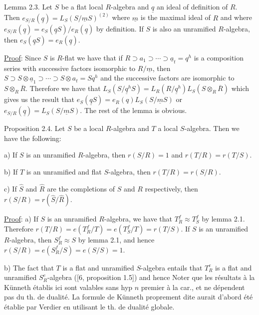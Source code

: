 Lemma 2.3. Let $S$ be a flat local $R$-algebra and $\underline q$ an ideal of definition
of $R$. Then $e_{S/R}(\underline q)=L_S(S/\underline m S)^{(2)}$ where $\underline m$ is the maximal ideal of $R$ and
where $e_{S/R}(\underline q)=e_S(\underline q S)/e_R(\underline q)$ by definition. If $S$ is also an unramified
$R$-algebra, then $e_S(\underline q S)=e_R(\underline q)$.

\uline{Proof}: Since $S$ is $R$-flat we have that if $R\supset a_1\supset\cdots\supset\underline a_t=q^h$
is a composition series with successive factors isomorphic to $R/\underline m$, then
$S\supset S\otimes\underline a_1\supset\cdots\supset S\otimes a_t=Sq^h$ and the successive factors are isomorphic
to $S\otimes_R\overline R$. Therefore we have that $L_S(S/\underline q^hS)=L_R(R/\underline q^h)L_S(S\otimes_R\overline R)$ which
gives us the result that $e_S(\underline q S)=e_R(q)L_S(S/\underline m S)$ or $e_{S/R}(\underline q)=L_S(S/\underline m S)$. The
rest of the lemma is obvious.

Proposition 2.4. Let $S$ be a local $R$-algebra and $T$ a local $S$-algebra.
Then we have the following:

a) If $S$ is an unramified $R$-algebra, then $r(S/R)=1$ and $r(T/R)=r(T/S)$.

b) If $T$ is an unramified and flat $S$-algebra, then $r(T/R)=r(S/R)$.

c) If $\widehat S$ and $\widehat R$ are the completions of $S$ and $R$ respectively, then
$r(S/R)=r(\widehat S/\widehat R)$.

\uline{Proof}: a) If $S$ is an unramified $R$-algebra, we have that $T_R^f\approx T_S^f$
by lemma 2.1. Therefore $r(T/R)=e(T_R^f/T)=e(T_S^f/T)=r(T/S)$. If $S$ is an
unramified $R$-algebra, then $S_R^f\approx S$ by lemma 2.1, and hence $r(S/R)=e(S_R^f/S)=
e(S/S)=1$.

b) The fact that $T$ is a flat and unramified $S$-algebra entails that
$T_R^e$ is a flat and unramified $S_R^e$-algebra ([6, proposition 1.5]) and hence
Noter que les résultats à la Künneth établis ici
sont valables sans hyp $n$ premier à la car., et
ne dépendent pas du th. de dualité. La formule
de Künneth proprement dite aurait d'abord été
établie par Verdier  en utilisant le th. de dualité
globale.


